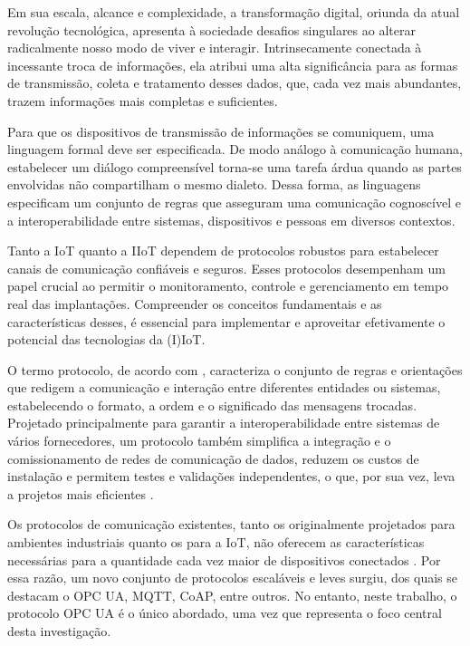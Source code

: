     Em sua escala, alcance e complexidade, a transformação digital, oriunda da atual revolução tecnológica, apresenta à sociedade desafios singulares ao alterar radicalmente nosso modo de viver e interagir. Intrinsecamente conectada à incessante troca de informações, ela atribui uma alta significância para as formas de transmissão, coleta e tratamento desses dados, que, cada vez mais abundantes, trazem informações mais completas e suficientes.

    Para que os dispositivos de transmissão de informações se comuniquem, uma linguagem formal deve ser especificada. De modo análogo à comunicação humana, estabelecer um diálogo compreensível torna-se uma tarefa árdua quando as partes envolvidas não compartilham o mesmo dialeto. Dessa forma, as linguagens especificam um conjunto de regras que asseguram uma comunicação cognoscível e a interoperabilidade entre sistemas, dispositivos e pessoas em diversos contextos.

    Tanto a IoT quanto a IIoT dependem de protocolos robustos para estabelecer canais de comunicação confiáveis e seguros. Esses protocolos desempenham um papel crucial ao permitir o monitoramento, controle e gerenciamento em tempo real das implantações. Compreender os conceitos fundamentais e as características desses, é essencial para implementar e aproveitar efetivamente o potencial das tecnologias da (I)IoT.

    O termo protocolo, de acordo com \cite{persson2015}, caracteriza o conjunto de regras e orientações que redigem a comunicação e interação entre diferentes entidades ou sistemas, estabelecendo o formato, a ordem e o significado das mensagens trocadas. Projetado principalmente para garantir a interoperabilidade entre sistemas de vários fornecedores, um protocolo também simplifica a integração e o comissionamento de redes de comunicação de dados, reduzem os custos de instalação e permitem testes e validações independentes, o que, por sua vez, leva a projetos mais eficientes \cite{mohagheghi2009}.

    Os protocolos de comunicação existentes, tanto os originalmente projetados para ambientes industriais quanto os para a IoT, não oferecem as características necessárias para a quantidade cada vez maior de dispositivos conectados \cite{markel2017}. Por essa razão, um novo conjunto de protocolos escaláveis e leves surgiu, dos quais se destacam o OPC UA, MQTT, CoAP, entre outros. No entanto, neste trabalho, o protocolo OPC UA é o único abordado, uma vez que representa o foco central desta investigação.
    
